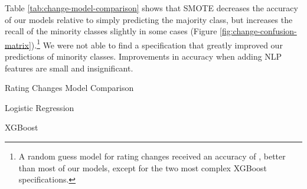 \documentclass{article}[11pt]
\begin{document}
    Table \ref{tab:change-model-comparison} shows that SMOTE decreases the accuracy of our models relative to simply predicting the majority class, but increases the recall of the minority classes slightly in some cases (Figure \ref{fig:change-confusion-matrix}).\footnote{A random guess model for rating changes received an accuracy of \changeRGAcc, better than most of our models, except for the two most complex XGBoost specifications.} We were not able to find a specification that greatly improved our predictions of minority classes. Improvements in accuracy when adding NLP features are small and insignificant.

    \begin{table}[h!]
        \centering
        \caption{Rating Changes Model Comparison}
        \begin{minipage}[c]{0.45\linewidth}
            \centering
            
            \caption*{\footnotesize Logistic Regression} 
        \end{minipage}
        \begin{minipage}[c]{0.45\linewidth}
            \centering
            
            \caption*{\footnotesize XGBoost} 
        \end{minipage}
        \label{tab:change-model-comparison}
    \end{table}
\end{document}
